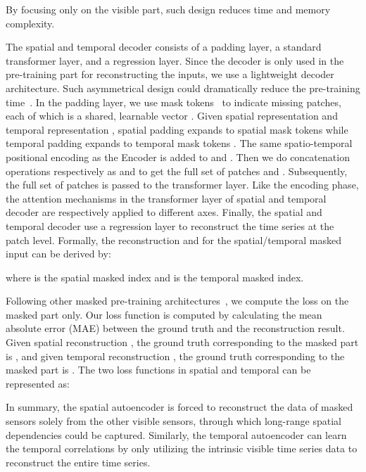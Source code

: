 \documentclass[letterpaper]{article} \usepackage{aaai24}  \usepackage{times}  \usepackage{helvet}  \usepackage{courier}  \usepackage[hyphens]{url}  \usepackage{graphicx} \urlstyle{rm} \def\UrlFont{\rm}  \usepackage{natbib}  \usepackage{caption} \frenchspacing  \setlength{\pdfpagewidth}{8.5in} \setlength{\pdfpageheight}{11in} \usepackage{algorithm}
\begin{document}
By focusing only on the visible part, such design reduces time and memory complexity. 






The spatial and temporal decoder consists of a padding layer, a standard transformer layer, and a regression layer. Since the decoder is only used in the pre-training part for reconstructing the inputs, we use a lightweight decoder architecture. Such asymmetrical design could dramatically reduce the pre-training time~\cite{he2022masked}. In the padding layer, we use mask tokens~\cite{devlin2018bert} to indicate missing patches, each of which is a shared, learnable vector . Given spatial representation  and temporal representation , spatial padding expands  to spatial mask tokens  while temporal padding expands  to temporal mask tokens . The same spatio-temporal positional encoding as the Encoder is added to  and . Then we do concatenation operations respectively as  and  to get the full set of patches  and . Subsequently, the full set of patches is passed to the transformer layer. Like the encoding phase, the attention mechanisms in the transformer layer of spatial and temporal decoder are respectively applied to different axes. Finally, the spatial and temporal decoder use a regression layer to reconstruct the time series at the patch level. Formally, the reconstruction  and  for the spatial/temporal masked input can be derived by:

where  is the spatial masked index and  is the temporal masked index.


Following other masked pre-training architectures~\cite{he2022masked,tong2022videomae,feichtenhofer2022masked}, we compute the loss on the masked part only. Our loss function is computed by calculating the mean absolute error (MAE) between the ground truth and the reconstruction result. 
Given spatial reconstruction , the ground truth corresponding to the masked part is , and given temporal reconstruction , the ground truth corresponding to the masked part is  .
The two loss functions in spatial and temporal can be represented as:


In summary, the spatial autoencoder is forced to reconstruct the data of masked sensors solely from the other visible sensors, through which long-range spatial dependencies could be captured. Similarly, the temporal autoencoder can learn the temporal correlations by only utilizing the intrinsic visible time series data to reconstruct the entire time series.
\end{document}
